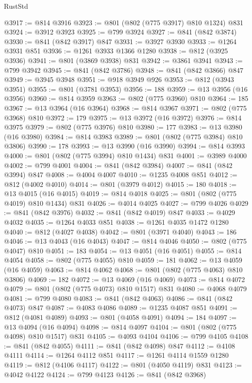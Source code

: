 \begin{lexlean}{RustStd}
\begin{coremodule}
{\begin{coremodule}
{{{{{@3917 := @814 @3916
@3923 := @801 (@802 (@775 @3917) @810 @1324) @831
@3924 := @3912 @3923
@3925 := @799 @3924
@3927 := @841 (@842 @3874)
@3930 := @841 (@842 @3917) @847
@3931 := @3927 @3930
@3933 := @1264 @3931 @851
@3936 := @1261 @3933 @1366 @1280
@3938 := @812 (@3925 @3936)
@3941 := @801 (@3869 @3938) @831
@3942 := @3861 @3941
@3943 := @799 @3942
@3945 := @841 (@842 @3786)
@3948 := @841 (@842 @3866) @847
@3949 := @3945 @3948
@3951 := @918 @3949 @926
@3953 := @812 (@3943 @3951)
@3955 := @801 (@3781 @3953)
@3956 := 188
@3959 := @13 @3956 (@16 @3956)
@3960 := @814 @3959
@3963 := @802 (@775 @3960) @810
@3964 := 185
@3967 := @13 @3964 (@16 @3964)
@3968 := @814 @3967
@3971 := @802 (@775 @3968) @810
@3972 := 179
@3975 := @13 @3972 (@16 @3972)
@3976 := @814 @3975
@3979 := @802 (@775 @3976) @810
@3980 := 177
@3983 := @13 @3980 (@16 @3980)
@3984 := @814 @3983
@3989 := @801 (@802 (@775 @3984) @810 @3806)
@3990 := 178
@3993 := @13 @3990 (@16 @3990)
@3994 := @814 @3993
@4000 := @801 (@802 (@775 @3994) @810 @1434) @831
@4001 := @3989 @4000
@4002 := @799 @4001
@4004 := @841 (@842 @3984)
@4007 := @841 (@842 @3994) @847
@4008 := @4004 @4007
@4010 := @1235 @4008 @851
@4012 := @812 (@4002 @4010)
@4014 := @801 (@3979 @4012)
@4015 := 180
@4018 := @13 @4015 (@16 @4015)
@4019 := @814 @4018
@4025 := @801 (@802 (@775 @4019) @810 @1434) @831
@4026 := @4014 @4025
@4027 := @799 @4026
@4029 := @841 (@842 @3976)
@4032 := @841 (@842 @4019) @847
@4033 := @4029 @4032
@4035 := @1264 @4033 @851
@4038 := @1261 @4035 @1472 @1280
@4040 := @812 (@4027 @4038)
@4042 := @801 (@3971 @4040)
@4043 := 186
@4046 := @13 @4043 (@16 @4043)
@4047 := @814 @4046
@4050 := @802 (@775 @4047) @810
@4051 := 183
@4054 := @13 @4051 (@16 @4051)
@4055 := @814 @4054
@4058 := @802 (@775 @4055) @810
@4059 := 181
@4062 := @13 @4059 (@16 @4059)
@4063 := @814 @4062
@4068 := @801 (@802 (@775 @4063) @810 @3806)
@4069 := 182
@4072 := @13 @4069 (@16 @4069)
@4073 := @814 @4072
@4079 := @801 (@802 (@775 @4073) @810 @1517) @831
@4080 := @4068 @4079
@4081 := @799 @4080
@4083 := @841 (@842 @4063)
@4086 := @841 (@842 @4073) @847
@4087 := @4083 @4086
@4089 := @1235 @4087 @851
@4091 := @812 (@4081 @4089)
@4093 := @801 (@4058 @4091)
@4094 := 184
@4097 := @13 @4094 (@16 @4094)
@4098 := @814 @4097
@4104 := @801 (@802 (@775 @4098) @810 @1517) @831
@4105 := @4093 @4104
@4106 := @799 @4105
@4108 := @841 (@842 @4055)
@4111 := @841 (@842 @4098) @847
@4112 := @4108 @4111
@4114 := @1264 @4112 @851
@4117 := @1261 @4114 @1559 @1280
@4119 := @812 (@4106 @4117)
@4122 := @801 (@4050 @4119) @831
@4123 := @4042 @4122
@4124 := @799 @4123
@4126 := @841 (@842 @3968)
}}}}}
\end{coremodule}}
\end{coremodule}
\end{lexlean}
